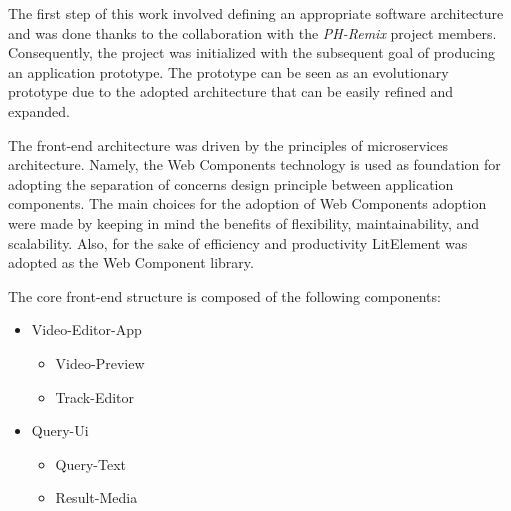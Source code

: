 The first step of this work involved defining an appropriate software architecture and was done thanks to the collaboration with the \emph{PH-Remix} project members. Consequently, the project was initialized with the subsequent goal of producing an application prototype. The prototype can be seen as an evolutionary prototype due to the adopted architecture that can be easily refined and expanded.

The front-end architecture was driven by the principles of microservices architecture. Namely, the Web Components technology is used as foundation for adopting the separation of concerns design principle between application components. The main choices for the adoption of Web Components adoption were made by keeping in mind the benefits of flexibility, maintainability, and scalability. Also, for the sake of efficiency and productivity LitElement was adopted as the Web Component library.

The core front-end structure is composed of the following components: 

\begin{itemize}
\item Video-Editor-App
    \begin{itemize}
        \item Video-Preview
        \item Track-Editor
    \end{itemize}
\item Query-Ui
    \begin{itemize}
        \item Query-Text
        \item Result-Media
    \end{itemize}
\end{itemize}

